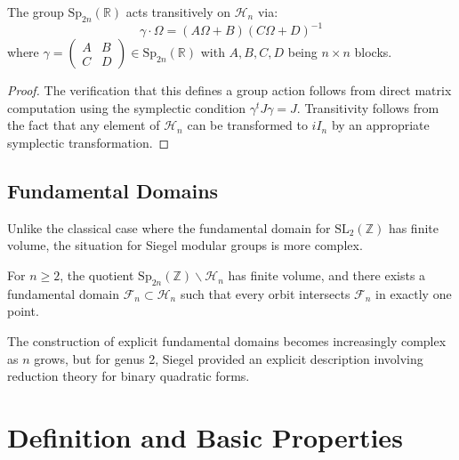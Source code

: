 \begin{theorem}
\label{thm:symplectic_action}
The group $\mathrm{Sp}_{2n}(\mathbb{R})$ acts transitively on $\mathcal{H}_n$ via:
\begin{equation}
\gamma \cdot \Omega = (A\Omega + B)(C\Omega + D)^{-1}
\label{eq:symplectic_action}
\end{equation}
where $\gamma = \begin{pmatrix} A & B \\ C & D \end{pmatrix} \in \mathrm{Sp}_{2n}(\mathbb{R})$ with $A, B, C, D$ being $n \times n$ blocks.
\end{theorem}

\begin{proof}
The verification that this defines a group action follows from direct matrix computation using the symplectic condition $\gamma^t J \gamma = J$. Transitivity follows from the fact that any element of $\mathcal{H}_n$ can be transformed to $iI_n$ by an appropriate symplectic transformation.
\end{proof}

\subsection{Fundamental Domains}

Unlike the classical case where the fundamental domain for $\mathrm{SL}_2(\mathbb{Z})$ has finite volume, the situation for Siegel modular groups is more complex.

\begin{theorem}
\label{thm:siegel_fundamental}
For $n \geq 2$, the quotient $\mathrm{Sp}_{2n}(\mathbb{Z}) \backslash \mathcal{H}_n$ has finite volume, and there exists a fundamental domain $\mathcal{F}_n \subset \mathcal{H}_n$ such that every orbit intersects $\mathcal{F}_n$ in exactly one point.
\end{theorem}

The construction of explicit fundamental domains becomes increasingly complex as $n$ grows, but for genus 2, Siegel provided an explicit description involving reduction theory for binary quadratic forms.

\section{Definition and Basic Properties}
\label{sec:definition_properties}


